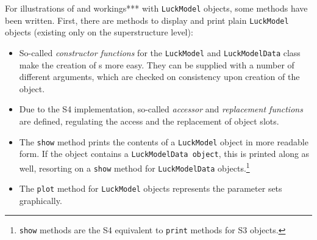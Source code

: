 For illustrations of and workings*** with \texttt{LuckModel} objects, some methods have
been written. First, there are methods to display and print plain \texttt{LuckModel}
objects (existing only on the superstructure level):
\begin{itemize}
\item So-called \emph{constructor functions} for the \texttt{LuckModel} and \texttt{LuckModelData} class
   make the creation of \model s more easy. They can be supplied with a 
   number of different arguments, which are checked on consistency upon
   creation of the object.
\item Due to the S4 implementation, so-called \emph{accessor} and \emph{replacement functions}
   are defined, regulating the access and the replacement of object slots.
\item The \texttt{show} method prints the contents of a \texttt{LuckModel} object in more
   readable form. If the object contains a \texttt{LuckModelData object}, this is
   printed along as well, resorting on a \texttt{show} method for \texttt{LuckModelData}
   objects.\footnote{\texttt{show} methods are the S4 equivalent to \texttt{print} methods for S3 objects.}
\item The \texttt{plot} method for \texttt{LuckModel} objects represents the parameter sets graphically.
\end{itemize}

